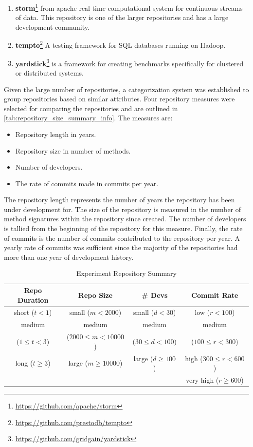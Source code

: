 \begin{enumerate}
\item \textbf{storm}\footnote{\url{https://github.com/apache/storm}} from apache real time computational system for continuous streams of data. This repository is one of the larger repositories and has a large development community.
\item \textbf{tempto}\footnote{\url{https://github.com/prestodb/tempto}} A testing framework for SQL databases running on Hadoop.
\item \textbf{yardstick}\footnote{\url{https://github.com/gridgain/yardstick}} is a framework for creating benchmarks specifically for clustered or distributed systems.

\end{enumerate}


Given the large number of repositories, a categorization system was established to group repositories based on similar attributes. Four repository measures were selected for comparing the repositories and are outlined in \autoref{tab:repository_size_summary_info}. The measures are:
\begin{itemize}
\item Repository length in years.
\item Repository size in number of methods.
\item Number of developers.
\item The rate of commits made in commits per year.
\end{itemize}
The repository length represents the number of years the repository has been under development for. The size of the repository is measured in the number of method signatures within the repository since created. The number of developers is tallied from the beginning of the repository for this measure. Finally, the rate of commits is the number of commits contributed to the repository per year. A yearly rate of commits was sufficient since the majority of the repositories had more than one year of development history.

\begin{table}
\begin{center}
    \begin{tabular}{|c|c|c|c|}
        \hline
        \textbf{Repo Duration} & \textbf{Repo Size} & \textbf{\# Devs} & \textbf{Commit Rate} \\
        \hline
        \hline
        short ($t < 1$) & small ($m < 2000$) & small ($d < 30$) & low ($r < 100$) \\
        \hline
        medium & medium & medium & medium \\
        ($1 \leq t < 3$) & ($2000 \leq m < 10000$) & ($30 \leq d < 100$) & ($100 \leq r < 300$) \\
        \hline
        long ($t \geq 3$) & large ($m \geq 10000$) & large ($d \geq 100$) & high ($300 \leq r < 600$) \\
        \hline
        & & & very high ($r \geq 600$) \\
        \hline
    \end{tabular}
\end{center}
\caption{Experiment Repository Summary}
\label{tab:repository_size_summary_info}
\end{table}

